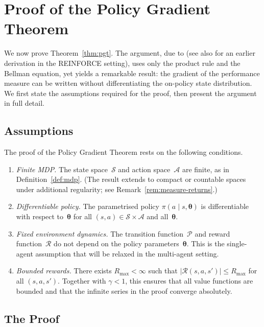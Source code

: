 
\chapter{Proof of the Policy Gradient Theorem}
\label{ch:pgt-proof}

We now prove Theorem~\ref{thm:pgt}. The argument, due to \cite{sutton2018rl} (see also \cite{williams1992} for an earlier derivation in the REINFORCE setting), uses only the product rule and the Bellman equation, yet yields a remarkable result: the gradient of the performance measure can be written without differentiating the on-policy state distribution. We first state the assumptions required for the proof, then present the argument in full detail.

\section{Assumptions}
\label{sec:pgt-assumptions}

The proof of the Policy Gradient Theorem rests on the following conditions.

\begin{enumerate}[label=(\roman*)]
  \item \emph{Finite MDP.}\; The state space~$\mathcal{S}$ and action space~$\mathcal{A}$ are finite, as in Definition~\ref{def:mdp}. (The result extends to compact or countable spaces under additional regularity; see Remark~\ref{rem:measure-returns}.)
  \item \emph{Differentiable policy.}\; The parametrised policy $\pi(a\mid s,\bm{\theta})$ is differentiable with respect to~$\bm{\theta}$ for all $(s,a) \in \mathcal{S}\times\mathcal{A}$ and all~$\bm{\theta}$.
  \item \emph{Fixed environment dynamics.}\; The transition function~$\mathcal{P}$ and reward function~$\mathcal{R}$ do not depend on the policy parameters~$\bm{\theta}$. This is the single-agent assumption that will be relaxed in the multi-agent setting.
  \item \emph{Bounded rewards.}\; There exists $R_{\max}<\infty$ such that $|\mathcal{R}(s,a,s')|\le R_{\max}$ for all $(s,a,s')$. Together with $\gamma<1$, this ensures that all value functions are bounded and that the infinite series in the proof converge absolutely.
\end{enumerate}

\section{The Proof}
\label{sec:pgt-proof-body}

